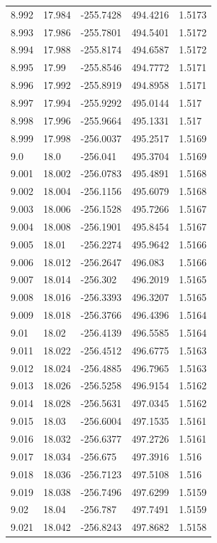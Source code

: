 \begin{tabular}{lllll}
8.992 & 17.984 & -255.7428 & 494.4216 & 1.5173 \\
8.993 & 17.986 & -255.7801 & 494.5401 & 1.5172 \\
8.994 & 17.988 & -255.8174 & 494.6587 & 1.5172 \\
8.995 & 17.99 & -255.8546 & 494.7772 & 1.5171 \\
8.996 & 17.992 & -255.8919 & 494.8958 & 1.5171 \\
8.997 & 17.994 & -255.9292 & 495.0144 & 1.517 \\
8.998 & 17.996 & -255.9664 & 495.1331 & 1.517 \\
8.999 & 17.998 & -256.0037 & 495.2517 & 1.5169 \\
9.0 & 18.0 & -256.041 & 495.3704 & 1.5169 \\
9.001 & 18.002 & -256.0783 & 495.4891 & 1.5168 \\
9.002 & 18.004 & -256.1156 & 495.6079 & 1.5168 \\
9.003 & 18.006 & -256.1528 & 495.7266 & 1.5167 \\
9.004 & 18.008 & -256.1901 & 495.8454 & 1.5167 \\
9.005 & 18.01 & -256.2274 & 495.9642 & 1.5166 \\
9.006 & 18.012 & -256.2647 & 496.083 & 1.5166 \\
9.007 & 18.014 & -256.302 & 496.2019 & 1.5165 \\
9.008 & 18.016 & -256.3393 & 496.3207 & 1.5165 \\
9.009 & 18.018 & -256.3766 & 496.4396 & 1.5164 \\
9.01 & 18.02 & -256.4139 & 496.5585 & 1.5164 \\
9.011 & 18.022 & -256.4512 & 496.6775 & 1.5163 \\
9.012 & 18.024 & -256.4885 & 496.7965 & 1.5163 \\
9.013 & 18.026 & -256.5258 & 496.9154 & 1.5162 \\
9.014 & 18.028 & -256.5631 & 497.0345 & 1.5162 \\
9.015 & 18.03 & -256.6004 & 497.1535 & 1.5161 \\
9.016 & 18.032 & -256.6377 & 497.2726 & 1.5161 \\
9.017 & 18.034 & -256.675 & 497.3916 & 1.516 \\
9.018 & 18.036 & -256.7123 & 497.5108 & 1.516 \\
9.019 & 18.038 & -256.7496 & 497.6299 & 1.5159 \\
9.02 & 18.04 & -256.787 & 497.7491 & 1.5159 \\
9.021 & 18.042 & -256.8243 & 497.8682 & 1.5158 \\

\end{tabular}
